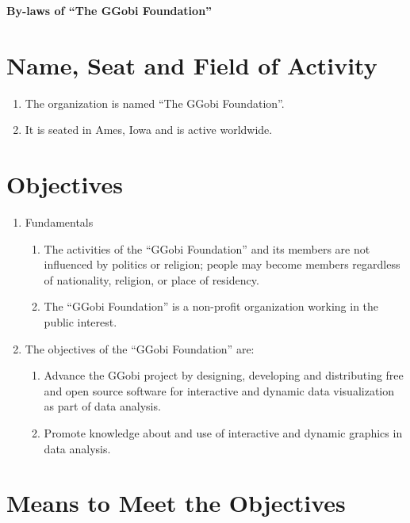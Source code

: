 \documentclass{article}
\begin{document}
\begin{center}
{\Large\bf By-laws of ``The GGobi Foundation''}
\end{center}

\date{}

\section{Name, Seat and Field of Activity}

\begin{enumerate} \itemsep 0in
\item The organization is named ``The GGobi Foundation''.
\item It is seated in Ames, Iowa and is active worldwide.
\end{enumerate}

\section{Objectives}

\begin{enumerate} \itemsep 0in
\item Fundamentals
\begin{enumerate} \itemsep 0in
\item The activities of the ``GGobi Foundation'' and its members are not 
influenced by politics or religion; people may become members
regardless of nationality, religion, or place of residency.
\item The ``GGobi Foundation'' is a non-profit organization working in the 
public interest.
\end{enumerate}
\item The objectives of the ``GGobi Foundation'' are:
\begin{enumerate} \itemsep 0in
\item Advance the GGobi project by designing, developing and
distributing free and open source software for interactive and dynamic
data visualization as part of data analysis.
\item Promote knowledge about and use of interactive and dynamic
graphics in data analysis.
\end{enumerate}
\end{enumerate}

\section{Means to Meet the Objectives}
\end{document}
